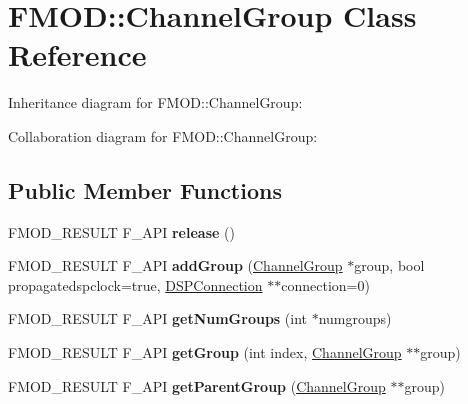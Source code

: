 \hypertarget{class_f_m_o_d_1_1_channel_group}{\section{F\+M\+O\+D\+:\+:Channel\+Group Class Reference}
\label{class_f_m_o_d_1_1_channel_group}
}


Inheritance diagram for F\+M\+O\+D\+:\+:Channel\+Group\+:


Collaboration diagram for F\+M\+O\+D\+:\+:Channel\+Group\+:
\subsection*{Public Member Functions}
\begin{DoxyCompactItemize}
\item 
\hypertarget{class_f_m_o_d_1_1_channel_group_a4f7fc3cf21050e3cd5e84f8a2f9a0fc9}{F\+M\+O\+D\+\_\+\+R\+E\+S\+U\+L\+T F\+\_\+\+A\+P\+I {\bfseries release} ()}\label{class_f_m_o_d_1_1_channel_group_a4f7fc3cf21050e3cd5e84f8a2f9a0fc9}

\item 
\hypertarget{class_f_m_o_d_1_1_channel_group_a8f9abbc359b51ed16f8bf158b0d62ba6}{F\+M\+O\+D\+\_\+\+R\+E\+S\+U\+L\+T F\+\_\+\+A\+P\+I {\bfseries add\+Group} (\hyperlink{class_f_m_o_d_1_1_channel_group}{Channel\+Group} $\ast$group, bool propagatedspclock=true, \hyperlink{class_f_m_o_d_1_1_d_s_p_connection}{D\+S\+P\+Connection} $\ast$$\ast$connection=0)}\label{class_f_m_o_d_1_1_channel_group_a8f9abbc359b51ed16f8bf158b0d62ba6}

\item 
\hypertarget{class_f_m_o_d_1_1_channel_group_afa0b87ae5828685c64c1aa921872fd58}{F\+M\+O\+D\+\_\+\+R\+E\+S\+U\+L\+T F\+\_\+\+A\+P\+I {\bfseries get\+Num\+Groups} (int $\ast$numgroups)}\label{class_f_m_o_d_1_1_channel_group_afa0b87ae5828685c64c1aa921872fd58}

\item 
\hypertarget{class_f_m_o_d_1_1_channel_group_a5ac9853233cf3fa367022f1219db26ff}{F\+M\+O\+D\+\_\+\+R\+E\+S\+U\+L\+T F\+\_\+\+A\+P\+I {\bfseries get\+Group} (int index, \hyperlink{class_f_m_o_d_1_1_channel_group}{Channel\+Group} $\ast$$\ast$group)}\label{class_f_m_o_d_1_1_channel_group_a5ac9853233cf3fa367022f1219db26ff}

\item 
\hypertarget{class_f_m_o_d_1_1_channel_group_ab953a5c6bf1dc0d25bed4af7c0653bee}{F\+M\+O\+D\+\_\+\+R\+E\+S\+U\+L\+T F\+\_\+\+A\+P\+I {\bfseries get\+Parent\+Group} (\hyperlink{class_f_m_o_d_1_1_channel_group}{Channel\+Group} $\ast$$\ast$group)}\label{class_f_m_o_d_1_1_channel_group_ab953a5c6bf1dc0d25bed4af7c0653bee}


\end{DoxyCompactItemize}
